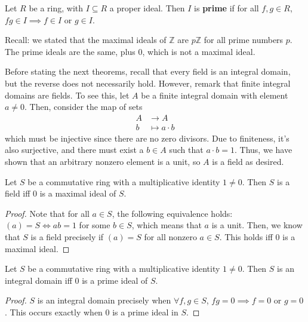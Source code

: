 \documentclass{article}
\theoremstyle{plain}
\newcommand{\Z}{\mathbb{Z}}
\begin{document}
\begin{definition}{}{}
Let $R$ be a ring, with $I \subseteq R$ a proper ideal. Then $I$ is \textbf{prime} if for all $f,g \in R$, $fg \in I \implies f\in I$ or $g \in I$.
\end{definition}
Recall: we stated that the maximal ideals of $\Z$ are $p\Z$ for all prime numbers $p$. The prime ideals are the same, plus $0$, which is not a maximal ideal.

Before stating the next theorems, recall that every field is an integral domain, but the reverse does not necessarily hold. However, remark that finite integral domains are fields. To see this, let $A$ be a finite integral domain with element $a \ne 0$. Then, consider the map of sets
\begin{align*}
    A &\to A \\
    b &\mapsto a\cdot b
\end{align*}
which must be injective since there are no zero divisors. Due to finiteness, it's also surjective, and there must exist a $b \in A$ such that $a\cdot b = 1$. Thus, we have shown that an arbitrary nonzero element is a unit, so $A$ is a field as desired.

\begin{theorem}{}{}
Let $S$ be a commutative ring with a multiplicative identity $1 \ne 0$. Then $S$ is a field iff $0$ is a maximal ideal of $S$.
\end{theorem}
\begin{proof}
Note that for all $a \in S$, the following equivalence holds: $(a) = S \iff ab = 1$ for some $b \in S$, which means that $a$ is a unit. Then, we know that $S$ is a field precisely if $(a) = S$ for all nonzero $a \in S$. This holds iff $0$ is a maximal ideal.
\end{proof}

\begin{theorem}{}{}
Let $S$ be a commutative ring with a multiplicative identity $1 \ne 0$. Then $S$ is an integral domain iff $0$ is a prime ideal of $S$.
\end{theorem}
\begin{proof}
$S$ is an integral domain precisely when $\forall f,g \in S$, $fg = 0 \implies f=0$ or $g=0$. This occurs exactly when $0$ is a prime ideal in $S$.
\end{proof}
\end{document}

